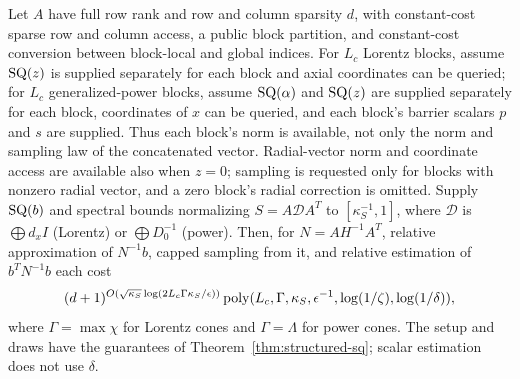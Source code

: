 \begin{corollary}\label{cor:cone-sq}
Let $A$ have full row rank and row and column sparsity $d$, with
constant-cost sparse row and column access, a public block partition, and
constant-cost conversion between block-local and global indices. For $L_c$
Lorentz blocks, assume $\mathrm{SQ}(z)$ is supplied separately for each block and
axial coordinates can be queried; for $L_c$ generalized-power blocks,
assume $\mathrm{SQ}(\alpha)$ and $\mathrm{SQ}(z)$ are supplied separately for each block,
coordinates of $x$ can be queried, and each block's barrier scalars $p$
and $s$ are supplied. Thus each block's norm is available, not only the
norm and sampling law of the concatenated vector. Radial-vector norm and
coordinate access are available also when $z=0$; sampling is requested
only for blocks with nonzero radial vector, and a zero block's radial
correction is omitted. Supply $\mathrm{SQ}(b)$ and spectral bounds normalizing
$S=A\mathcal D A^T$ to $[\kappa_S^{-1},1]$, where $\mathcal D$ is
$\bigoplus d_xI$ (Lorentz) or $\bigoplus D_0^{-1}$ (power). Then, for
$N=AH^{-1}A^T$, relative approximation of $N^{-1}b$, capped sampling from
it, and relative estimation of $b^TN^{-1}b$ each cost
\begin{equation}\label{eq:cone-cost}
 (d+1)^{O(\sqrt{\kappa_S}\log(2L_c\Gamma\kappa_S/\epsilon))}
 \operatorname{poly}(L_c,\Gamma,\kappa_S,\epsilon^{-1},
                         \log(1/\zeta),\log(1/\delta)),
\end{equation}
where $\Gamma=\max\chi$ for Lorentz cones and $\Gamma=\Lambda$ for
power cones. The setup and draws have the guarantees of
Theorem~\ref{thm:structured-sq}; scalar estimation does not use $\delta$.
\end{corollary}
